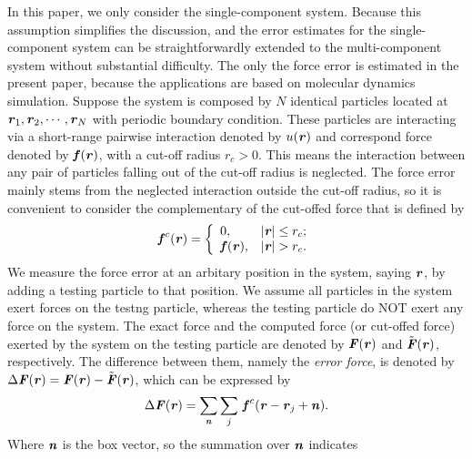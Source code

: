 \documentclass[aps,pre,preprint]{revtex4}
\renewcommand{\v}[1]{\textbf{\textit{#1}}}
\begin{document}
In this paper, we only consider the single-component system. Because
this assumption simplifies the discussion, and the error estimates for
the single-component system can be straightforwardly extended to the
multi-component system without substantial difficulty.  The only the
force error is estimated in the present paper, because the
applications are based on molecular dynamics simulation.
Suppose the system is composed by $N$ identical particles located at
$\v r_1, \v r_2, \cdots, \v r_N$ with periodic boundary condition.
 These particles are interacting via a
short-range pairwise interaction denoted by $u(\v r)$ and correspond
force denoted by $\v f(\v r)$, with a cut-off radius $r_c > 0$.  This
means the interaction between any pair of particles falling out of the
cut-off radius is neglected.
The force error mainly stems from the neglected interaction outside
the cut-off radius, so it is convenient to consider the complementary
of the cut-offed force that is defined by
\begin{align}
  \v f^c(\v r) =
  \left\{
  \begin{array}{ll}
    0, & \vert\v r\vert\leq r_c; \\
    \v f(\v r), & \vert\v r\vert > r_c.
  \end{array}
  \right.
\end{align}
We measure the force error at an arbitary position in the system,
saying $\v r$, by adding a testing particle to that position.  We
assume all particles in the system exert forces on the testng
particle, whereas the testing particle do NOT exert any force on the
system.  The exact force and the computed force (or cut-offed force)
exerted by the system on the testing particle are denoted by ${\v
  F}(\v r)$ and $\tilde{\v F}(\v r)$, respectively.  The difference
between them, namely the \emph{error force}, is denoted by $\Delta\v
F(\v r) = \v F(\v r) - \tilde{\v F}(\v r)$, which can be expressed by
\begin{align}
  \Delta\v F(\v r) = \sum_{\v n}\sum_{j}\, \v f^c(\v r - \v r_j + \v n).
\end{align}
Where $\v n$ is the box vector, so the summation over $\v n$ indicates
\end{document}
